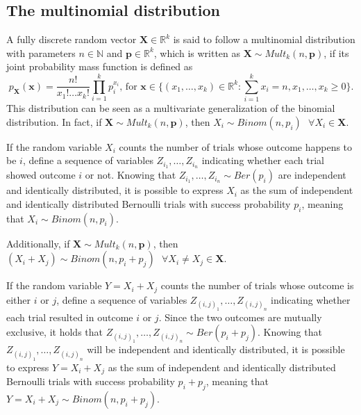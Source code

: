 \documentclass{report}
\begin{document}
\subsection{The multinomial distribution}
A fully discrete random vector $\displaystyle \mathbf{X} \in \mathbb{R}^k$ is said to follow a multinomial distribution with parameters $\displaystyle n \in \mathbb{N}$ and $\displaystyle \mathbf{p} \in \mathbb{R}^k$, which is written as $\displaystyle \mathbf{X} \sim Mult_k(n, \mathbf{p})$, if its joint probability mass function is defined as
\[p_{\mathbf{X}}(\mathbf{x}) = \frac{n!}{x_1! \dots x_k!}\prod_{i = 1}^k p_i^{x_i} \text{, for $\displaystyle \mathbf{x} \in \Bigg\{(x_1, \dots, x_k) \in \mathbb{R}^k : \sum_{i = 1}^k x_i = n, x_1, \dots, x_k \ge 0 \Bigg\}$.}\]
This distribution can be seen as a multivariate generalization of the binomial distribution. \newline
In fact, if $\displaystyle \mathbf{X} \sim Mult_k(n, \mathbf{p})$, then $\displaystyle X_i \sim Binom(n, p_i) \text{ } \forall X_i \in \mathbf{X}$.
\begin{proofbox}
    If the random variable $\displaystyle X_i$ counts the number of trials whose outcome happens to be $\displaystyle i$, define a sequence of variables $\displaystyle Z_{i_1}, \dots, Z_{i_n}$ indicating whether each trial showed outcome $\displaystyle i$ or not. \newline
    Knowing that $\displaystyle Z_{i_1}, \dots, Z_{i_n} \sim Ber(p_i)$ are independent and identically distributed, it is possible to express $\displaystyle X_i$ as the sum of independent and identically distributed Bernoulli trials with success probability $\displaystyle p_i$, meaning that $\displaystyle X_i \sim Binom(n, p_i)$.
\end{proofbox}
\noindent Additionally, if $\displaystyle \mathbf{X} \sim Mult_k(n, \mathbf{p})$, then $\displaystyle (X_i + X_j) \sim Binom(n, p_i + p_j) \text{ } \forall X_i \neq X_j \in \mathbf{X}$.
\begin{proofbox}
    If the random variable $\displaystyle Y = X_i + X_j$ counts the number of trials whose outcome is either $\displaystyle i$ or $\displaystyle j$, define a sequence of variables $\displaystyle Z_{(i, j)_1}, \dots, Z_{(i, j)_n}$ indicating whether each trial resulted in outcome $\displaystyle i$ or $\displaystyle j$. \newline
    Since the two outcomes are mutually exclusive, it holds that $\displaystyle Z_{(i, j)_1}, \dots, Z_{(i, j)_n} \sim Ber(p_i + p_j)$. \newline
    Knowing that $\displaystyle Z_{(i, j)_1}, \dots, Z_{(i, j)_n}$ will be independent and identically distributed, it is possible to express $\displaystyle Y = X_i + X_j$ as the sum of independent and identically distributed Bernoulli trials with success probability $\displaystyle p_i + p_j$, meaning that $\displaystyle Y = X_i + X_j \sim Binom(n, p_i + p_j)$.
\end{proofbox}
\end{document}
